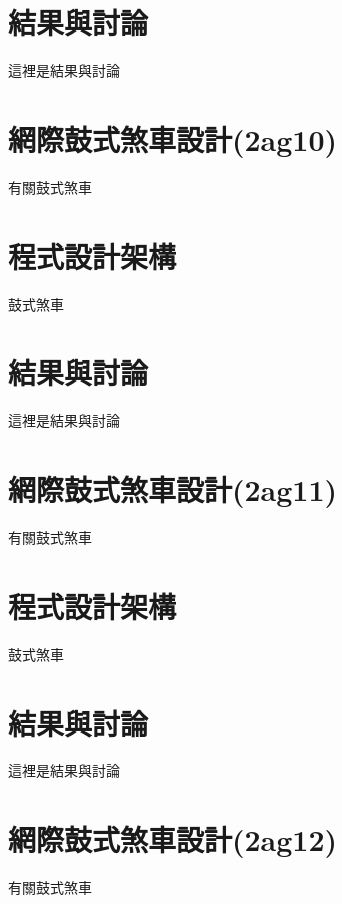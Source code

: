\documentclass[]{article}
\begin{document}
\section{結果與討論}\label{ux7d50ux679cux8207ux8a0eux8ad6-6}

這裡是結果與討論

\section{網際鼓式煞車設計(2ag10)}\label{ux7db2ux969bux9f13ux5f0fux715eux8ecaux8a2dux8a082ag10}

有關鼓式煞車

\section{程式設計架構}\label{ux7a0bux5f0fux8a2dux8a08ux67b6ux69cb-6}

鼓式煞車

\section{結果與討論}\label{ux7d50ux679cux8207ux8a0eux8ad6-7}

這裡是結果與討論

\section{網際鼓式煞車設計(2ag11)}\label{ux7db2ux969bux9f13ux5f0fux715eux8ecaux8a2dux8a082ag11}

有關鼓式煞車

\section{程式設計架構}\label{ux7a0bux5f0fux8a2dux8a08ux67b6ux69cb-7}

鼓式煞車

\section{結果與討論}\label{ux7d50ux679cux8207ux8a0eux8ad6-8}

這裡是結果與討論

\section{網際鼓式煞車設計(2ag12)}\label{ux7db2ux969bux9f13ux5f0fux715eux8ecaux8a2dux8a082ag12}

有關鼓式煞車
\end{document}
